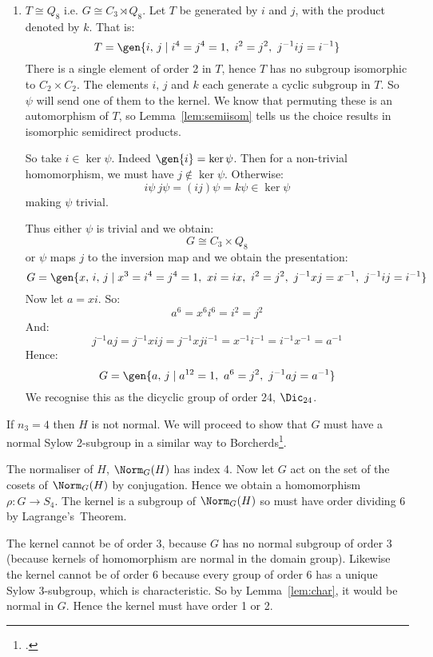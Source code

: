 \begin{enumerate}
    \item \(T \cong Q_8\) i.e. \(G \cong C_3 \rtimes Q_8\).
        Let \(T\) be generated by \(i\) and \(j\), with the product denoted by \(k\).
        That is:
        \[T = \gen{i,\,j \mid i^4 = j^4 = 1,\ i^2 = j^2,\ j^{-1}ij = i^{-1}}\]
        There is a single element of order 2 in \(T\), hence \(T\) has no subgroup isomorphic to \(C_2 \times C_2\).
        The elements \(i,\,j\) and \(k\) each generate a cyclic subgroup in \(T\).
        So \(\psi\) will send one of them to the kernel.
        We know that permuting these is an automorphism of \(T\), so Lemma~\ref{lem:semiisom} tells us the choice
        results in isomorphic semidirect products.

        So take \(i \in \ker{\psi}\).
        Indeed \(\gen{i} = \ker\psi\).
        Then for a non-trivial homomorphism, we must have \(j \notin \ker{\psi}\).
        Otherwise:
        \[i\psi\ j\psi = (ij)\psi = k\psi \in \ker{\psi}\]
        making \(\psi\) trivial.

        Thus either \(\psi\) is trivial and we obtain:
        \[G \cong C_3 \times Q_8\]
        or \(\psi\) maps \(j\) to the inversion map and we obtain the presentation:
        \[G = \gen{x,\,i,\,j \mid x^3 = i^4 = j^4 = 1,\ xi = ix,\ i^2 = j^2,\ j^{-1}xj = x^{-1},\ j^{-1}ij = i^{-1}}\]
        Now let \(a = xi\).
        So:
        \[a^6 = x^6 i^6 = i^2 = j^2\]
        And:
        \[j^{-1}aj = j^{-1}xij = j^{-1}xji^{-1} = x^{-1}i^{-1} = i^{-1}x^{-1} = a^{-1}\]
        Hence:
        \[G = \gen{a,\,j \mid a^{12} = 1,\ a^6 = j^2,\ j^{-1}aj = a^{-1}}\]
        We recognise this as the dicyclic group of order 24, \(\Dic_{24}\).
\end{enumerate}

If \(n_3 = 4\) then \(H\) is not normal.
We will proceed to show that \(G\) must have a normal Sylow 2-subgroup in a similar way to Borcherds\footcite{order24}.

The normaliser of \(H\), \(\Norm_G(H)\) has index 4.
Now let \(G\) act on the set of the cosets of \(\Norm_G(H)\) by conjugation.
Hence we obtain a homomorphism \(\rho:G \to S_4\).
The kernel is a subgroup of \(\Norm_G(H)\) so must have order dividing 6 by Lagrange's~Theorem.

The kernel cannot be of order 3, because \(G\) has no normal subgroup of order 3 (because kernels of homomorphism are
normal in the domain group).
Likewise the kernel cannot be of order 6 because every group of order 6 has a unique Sylow 3-subgroup, which is
characteristic.
So by Lemma~\ref{lem:char}, it would be normal in \(G\).
Hence the kernel must have order 1 or 2.


